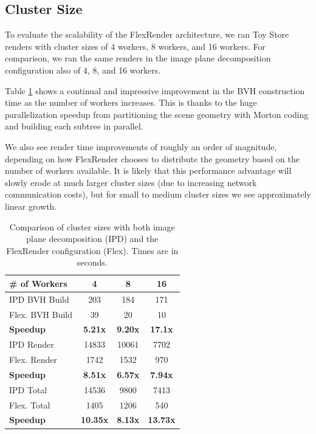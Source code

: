 \documentclass[a4paper,twoside]{article}
\begin{document}
\subsection{Cluster Size}
\label{clustersize}

To evaluate the scalability of the FlexRender architecture, we ran Toy Store
renders with cluster sizes of 4 workers, 8 workers, and 16 workers. For
comparison, we ran the same renders in the image plane decomposition
configuration also of 4, 8, and 16 workers.

Table \ref{tb:clustersize} shows a continual and impressive improvement in the
BVH construction time as the number of workers increases. This is thanks to the
huge parallelization speedup from partitioning the scene geometry with Morton
coding and building each subtree in parallel.

We also see render time improvements of roughly an order of magnitude, depending
on how FlexRender chooses to distribute the geometry based on the number of
workers available. It is likely that this performance advantage will slowly
erode at much larger cluster sizes (due to increasing network communication
costs), but for small to medium cluster sizes we see approximately linear growth.

\begin{table}
\begin{center}
\begin{tabular}{|l||c|c|c|}
    \hline
    \# of Workers & 4 & 8 & 16 \\
    \hline
    \hline
    IPD BVH Build & 203 & 184 & 171 \\
    \hline
    Flex. BVH Build & 39 & 20 & 10 \\
    \hline
    \textbf{Speedup} & \textbf{5.21x} & \textbf{9.20x} & \textbf{17.1x} \\
    \hline
    \hline
    IPD Render & 14833 & 10061 & 7702 \\
    \hline
    Flex. Render & 1742 & 1532  & 970 \\
    \hline
    \textbf{Speedup} & \textbf{8.51x} & \textbf{6.57x} & \textbf{7.94x} \\
    \hline
    \hline
    IPD Total & 14536 & 9800 & 7413 \\
    \hline
    Flex. Total & 1405 & 1206 & 540 \\
    \hline
    \textbf{Speedup} & \textbf{10.35x} & \textbf{8.13x} & \textbf{13.73x} \\
    \hline
\end{tabular}
\caption{Comparison of cluster sizes with both image plane decomposition (IPD) and the FlexRender configuration (Flex). Times are in seconds.}
\label{tb:clustersize}
\end{center}
\end{table}
\end{document}
